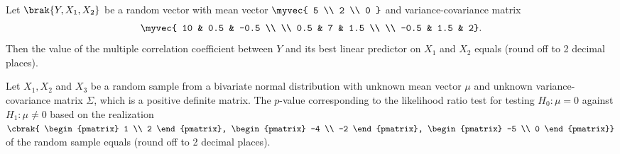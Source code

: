 \item Let $\brak{Y, X_1, X_2}$ be a random vector with mean vector 
	$\myvec{ 5 \\ 2 \\ 0 }$
	 and variance-covariance matrix
\begin{align*}
	\myvec{ 10 & 0.5 & -0.5 \\ \\ 
	0.5 & 7 & 1.5 \\ \\ 
	-0.5 & 1.5 & 2}.
\end{align*}
Then the value of the multiple correlation coefficient between $Y$ and its best linear predictor on $X_1$ and $X_2$ equals \underline{\hspace{1cm}} (round off to 2 decimal places).

\item Let $X_1, X_2$ and $X_3$ be a random sample from a bivariate normal distribution with unknown mean vector $\mu$ and unknown variance-covariance matrix $\Sigma$, which is a positive definite matrix. The $p$-value corresponding to the likelihood ratio test for testing $H_0: \mu = 0$ against $H_1: \mu \neq 0$ based on the realization $\cbrak{ \begin{pmatrix} 1 \\ 2 \end{pmatrix}, \begin{pmatrix} -4 \\ -2 \end{pmatrix}, \begin{pmatrix} -5 \\ 0 \end{pmatrix}}$  of the random sample equals \underline{\hspace{1cm}} (round off to 2 decimal places).


